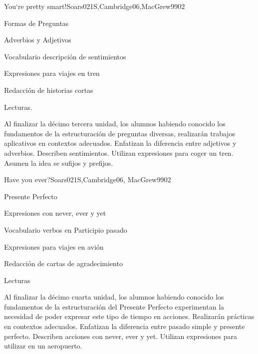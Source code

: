 \begin{syllabus}
\begin{unit}{You`re pretty smart!}{}{Soars021S,Cambridge06,MacGrew99}{0}{2}
\begin{topics}
      \item Formas de Preguntas
      \item Adverbios y Adjetivos
      \item Vocabulario descripción de sentimientos
      \item Expresiones para viajes en tren 
      \item Redacción de historias cortas
      \item Lecturas.
   \end{topics}

   \begin{learningoutcomes}
      \item Al finalizar la décimo tercera unidad, los alumnos habiendo conocido los fundamentos de la estructuración de preguntas diversas, realizarán trabajos aplicativos en contextos adecuados. Enfatizan la diferencia entre adjetivos y adverbios. Describen sentimientos. Utilizan expresiones para coger un tren. Asumen la idea se sufijos y prefijos.
   \end{learningoutcomes}

\end{unit}

\begin{unit}{Have you ever?}{}{Soars021S,Cambridge06, MacGrew99}{0}{2}
   \begin{topics}
      \item Presente Perfecto
      \item Expresiones con never, ever y yet
      \item Vocabulario verbos en Participio pasado
      \item Expresiones para viajes en avión 
      \item Redacción de cartas de agradecimiento
      \item Lecturas
   \end{topics}

   \begin{learningoutcomes}
      \item Al finalizar la décimo cuarta unidad, los alumnos habiendo conocido los fundamentos de la estructuración del Presente Perfecto experimentan la necesidad de poder expresar este tipo de tiempo en acciones. Realizarán prácticas en contextos adecuados. Enfatizan la diferencia entre pasado simple y presente perfecto. Describen acciones con never, ever y yet. Utilizan expresiones para utilizar en un aeropuerto.
   \end{learningoutcomes}

\end{unit}

\begin{coursebibliography}
\end{coursebibliography}

\end{syllabus}
%
